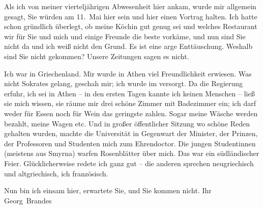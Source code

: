 \pstart
           Als ich von meiner vierteljährigen Abwesenheit hier ankam, wurde mir allgemein
               gesagt, Sie würden am 11. Mai hier sein und hier einen Vortrag halten.
               Ich hatte schon gründlich überlegt, ob meine Köchin gut genug sei und welches Restaurant wir für Sie und
               mich und einige Freunde die beste vorkäme, und nun sind Sie nicht da und ich weiß
               nicht den Grund. Es ist eine arge Enttäuschung. Weshalb sind Sie nicht gekommen?
               Unsere Zeitungen sagen es nicht.\pend
           
\pstart
           Ich war in Griechenland. Mir wurde in Athen viel Freundlichkeit erwiesen. Was nicht Sokrates gelang, geschah mir; ich wurde im
                  \label{K_L02383-2v}\label{K_L02383-2} versorgt. Da die
               Regierung erfuhr, ich sei in Athen – in den
               ersten Tagen kannte ich keinen Menschen – ließ sie mich wissen, sie räume mir drei
               schöne Zimmer mit Badezimmer ein; ich darf weder für Essen noch für Wein das
               geringste zahlen. Sogar meine Wäsche werden bezahlt, meine Wagen etc. Und in großer
               öffentlicher Sitzung wo schöne Reden gehalten wurden, machte die Universität in Gegenwart der Minister, der Prinzen, der
               Professoren und Studenten mich zum Ehrendoctor. Die jungen Studentinnen (meistens aus
                  Smyrna) warfen Rosenblätter über mich. Das
               war ein südländischer Feier. Glücklicherweise redete ich ganz gut – die
               anderen sprechen neugriechisch und altgriechisch, ich französisch.\pend
           
\pstart
           Nun bin ich einsam hier, erwartete Sie, und Sie kommen nicht.\pend
           \pstart Ihr \spacefill\mbox{Georg Brandes}\pend{}\endnumbering{}  
      